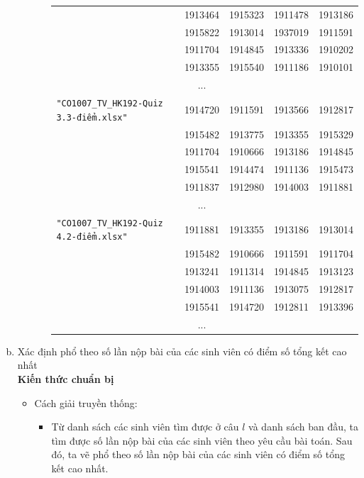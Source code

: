 \documentclass[a4paper]{article}
\theoremstyle{definition}
\begin{document}
\begin{enumerate}[a)]
\begin{itemize}
\begin{itemize}
\begin{center}
\begin{tabular}{l c c c c}
                     & 1913464 & 1915323 & 1911478 & 1913186\\
                     & 1915822 & 1913014 & 1937019 & 1911591\\
                     & 1911704 & 1914845 & 1913336 & 1910202\\
                     & 1913355 & 1915540 & 1911186 & 1910101\\
                     & ...\\
                     \texttt{"CO1007\_TV\_HK192-Quiz 3.3-điểm.xlsx"} & 1914720 & 1911591 & 1913566 & 1912817\\
                     & 1915482 & 1913775 & 1913355 & 1915329\\
                     & 1911704 & 1910666 & 1913186 & 1914845\\
                     & 1915541 & 1914474 & 1911136 & 1915473\\
                     & 1911837 & 1912980 & 1914003 & 1911881\\
                     & ...\\
                     \texttt{"CO1007\_TV\_HK192-Quiz 4.2-điểm.xlsx"} & 1911881 & 1913355 & 1913186 & 1913014\\
                     & 1915482 & 1910666 & 1911591 & 1911704\\
                     & 1913241 & 1911314 & 1914845 & 1913123\\
                     & 1914003 & 1911136 & 1913075 & 1912817\\
                     & 1915541 & 1914720 & 1912811 & 1913396\\
                     & ...
                \end{tabular}
            \end{center}
        \end{itemize}
    \end{itemize}
    \bf\item {Xác định phổ theo số lần nộp bài của các sinh viên có điểm số tổng kết cao nhất}\\[6pt]
    \bf Kiến thức chuẩn bị\normalfont
    \begin{itemize}
        \item Cách giải truyền thống:
        \begin{itemize}
            \item Từ danh sách các sinh viên tìm được ở câu $l$ và danh sách ban đầu, ta tìm được số lần nộp bài của các sinh viên theo yêu cầu bài toán. Sau đó, ta vẽ phổ theo số lần nộp bài của các sinh viên có điểm số tổng kết cao nhất.

\end{itemize}
\end{itemize}
\end{enumerate}
\end{document}
